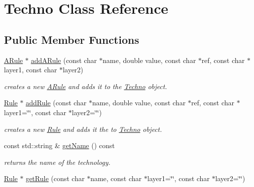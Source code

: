 \hypertarget{class_d_t_r_1_1_techno}{}\section{Techno Class Reference}
\label{class_d_t_r_1_1_techno}
\subsection*{Public Member Functions}
\begin{DoxyCompactItemize}
\item 
\mbox{\hyperlink{class_d_t_r_1_1_a_rule}{A\+Rule}} $\ast$ \mbox{\hyperlink{class_d_t_r_1_1_techno_a5f5a790974fe7d3b1c6f1b698ef0a818}{add\+A\+Rule}} (const char $\ast$name, double value, const char $\ast$ref, const char $\ast$layer1, const char $\ast$layer2)
\begin{DoxyCompactList}\small\item\em creates a new \mbox{\hyperlink{class_d_t_r_1_1_a_rule}{A\+Rule}} and adds it to the \mbox{\hyperlink{class_d_t_r_1_1_techno}{Techno}} object. \end{DoxyCompactList}\item 
\mbox{\hyperlink{class_d_t_r_1_1_rule}{Rule}} $\ast$ \mbox{\hyperlink{class_d_t_r_1_1_techno_afa2c8412c365c950649b9f81661ecafd}{add\+Rule}} (const char $\ast$name, double value, const char $\ast$ref, const char $\ast$layer1=\char`\"{}\char`\"{}, const char $\ast$layer2=\char`\"{}\char`\"{})
\begin{DoxyCompactList}\small\item\em creates a new \mbox{\hyperlink{class_d_t_r_1_1_rule}{Rule}} and adds it the to \mbox{\hyperlink{class_d_t_r_1_1_techno}{Techno}} object. \end{DoxyCompactList}\item 
\mbox{\label{class_d_t_r_1_1_techno_a3fd7335faa33dce2f87c7e50eef3e294}} 
const std\+::string \& \mbox{\hyperlink{class_d_t_r_1_1_techno_a3fd7335faa33dce2f87c7e50eef3e294}{get\+Name}} () const
\begin{DoxyCompactList}\small\item\em returns the name of the technology. \end{DoxyCompactList}\item 
\mbox{\hyperlink{class_d_t_r_1_1_rule}{Rule}} $\ast$ \mbox{\hyperlink{class_d_t_r_1_1_techno_a4d56a05b47bd6c51e4e18120f49b584b}{get\+Rule}} (const char $\ast$name, const char $\ast$layer1=\char`\"{}\char`\"{}, const char $\ast$layer2=\char`\"{}\char`\"{})

\end{DoxyCompactItemize}
